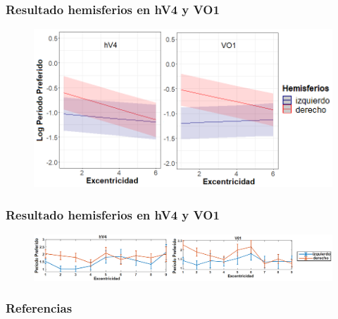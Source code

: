 \documentclass[
11pt, %
%
aspectratio=169, %
]{beamer}
\begin{document}
\begin{frame}
	\frametitle{Resultado hemisferios en hV4 y VO1}
	
		\begin{figure}			
		\centering
		\includegraphics[scale=0.5]{Graphics/hV4}
		\captionsetup{font=tiny}
		
	\end{figure}
	
\end{frame}

\begin{frame}
	\frametitle{Resultado hemisferios en hV4 y VO1}
	

		\begin{figure}			
			\centering
			\includegraphics[scale=0.4]{Graphics/hv4_VO1}
						
		\end{figure}
		
	
	
\end{frame}



	
	\begin{frame}
	\frametitle{Referencias}
	     
	
	
	
	
	
	\end{frame}
	
\end{document}
